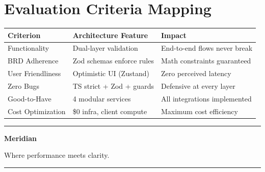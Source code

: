 \documentclass[12pt, a4paper]{article}
\begin{document}
\section{Evaluation Criteria Mapping}

\vspace{8pt}
\renewcommand{\arraystretch}{1.35}
\begin{center}
\begin{tabularx}{\textwidth}{@{}l l X@{}}
\toprule
\textbf{Criterion} & \textbf{Architecture Feature} & \textbf{Impact} \\
\midrule
Functionality & Dual-layer validation & End-to-end flows never break \\
BRD Adherence & Zod schemas enforce rules & Math constraints guaranteed \\
User Friendliness & Optimistic UI (Zustand) & Zero perceived latency \\
Zero Bugs & TS strict + Zod + guards & Defensive at every layer \\
Good-to-Have & 4 modular services & All integrations implemented \\
Cost Optimization & \$0 infra, client compute & Maximum cost efficiency \\
\bottomrule
\end{tabularx}
\end{center}

\vspace{2cm}

\begin{center}
{\color{border}\rule{0.35\textwidth}{0.4pt}}

\vspace{0.6cm}

{\fontsize{28}{34}\selectfont\bfseries\color{brand} Meridian}

\vspace{0.3cm}

{\large\color{textsecondary} Where performance meets clarity.}

\vspace{0.5cm}

{\color{border}\rule{0.35\textwidth}{0.4pt}}
\end{center}
\end{document}
